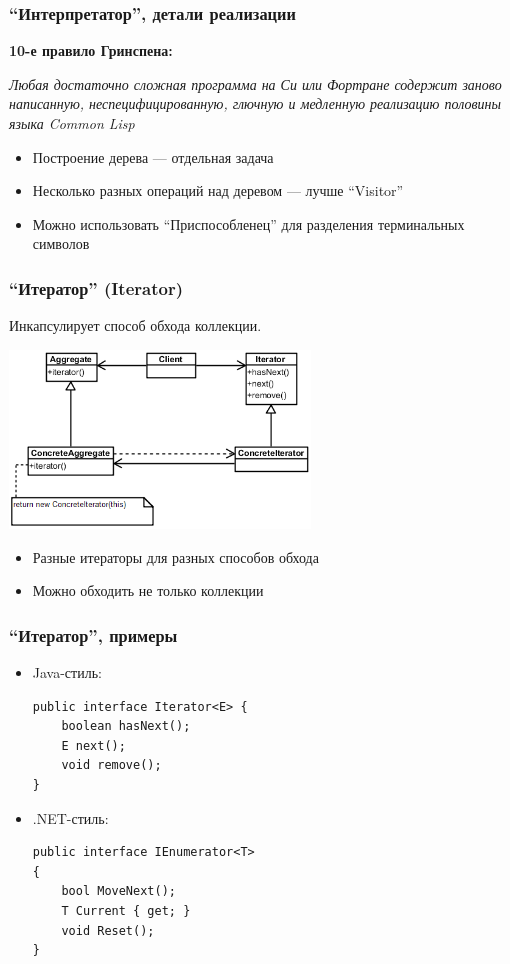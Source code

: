 \documentclass[xetex,mathserif,serif]{beamer}
\begin{document}
	\begin{frame}
		\frametitle{``Интерпретатор'', детали реализации}
		\begin{footnotesize}
			\textbf{10-е правило Гринспена:}
			
			\textit{Любая достаточно сложная программа на Си или Фортране содержит заново написанную, неспецифицированную, глючную и медленную реализацию половины языка Common Lisp}
		\end{footnotesize}
		\begin{itemize}
			\item Построение дерева --- отдельная задача
			\item Несколько разных операций над деревом --- лучше ``Visitor''
			\item Можно использовать ``Приспособленец'' для разделения терминальных символов
		\end{itemize}
	\end{frame}

	\begin{frame}
		\frametitle{``Итератор'' (Iterator)}
		Инкапсулирует способ обхода коллекции.
		\begin{center}
			\includegraphics[width=0.6\textwidth]{iterator.png}
		\end{center}
		\begin{itemize}
			\item Разные итераторы для разных способов обхода
			\item Можно обходить не только коллекции
		\end{itemize}
	\end{frame}

	\begin{frame}[fragile]
		\frametitle{``Итератор'', примеры}
		\begin{itemize}
			\item Java-стиль:
			\begin{verbatim}
public interface Iterator<E> {
    boolean hasNext();
    E next();
    void remove();
}
			\end{verbatim}
			\item .NET-стиль:
			\begin{verbatim}
public interface IEnumerator<T>
{
    bool MoveNext();
    T Current { get; }
    void Reset();
}
			\end{verbatim}
		\end{itemize}
	\end{frame}
\end{document}
